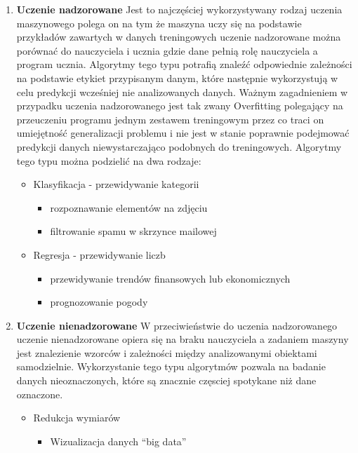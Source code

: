 \begin{enumerate}
    \item \textbf{Uczenie nadzorowane}
    Jest to najczęściej wykorzystywany rodzaj uczenia maszynowego polega on na tym 
    że maszyna uczy się na podstawie przykładów zawartych w danych treningowych 
    uczenie nadzorowane można porównać do nauczyciela i ucznia gdzie dane pełnią rolę nauczyciela 
    a program ucznia. Algorytmy tego typu potrafią znaleźć odpowiednie zależności na podstawie
    etykiet przypisanym danym,
    które następnie wykorzystują w celu predykcji wcześniej nie analizowanych danych.
    Ważnym zagadnieniem w przypadku uczenia nadzorowanego jest tak zwany Overfitting polegający 
    na przeuczeniu programu jednym zestawem treningowym przez co traci on umiejętność generalizacji problemu
    i nie jest w stanie poprawnie podejmować predykcji danych niewystarczająco podobnych
    do treningowych. Algorytmy tego typu można podzielić na dwa rodzaje:
    \begin{itemize}
        \item Klasyfikacja - przewidywanie kategorii
        \begin{itemize}
            \item rozpoznawanie elementów na zdjęciu
            \item filtrowanie spamu w skrzynce mailowej
        \end{itemize}
        \item Regresja - przewidywanie liczb
        \begin{itemize}
            \item przewidywanie trendów finansowych lub ekonomicznych
            \item prognozowanie pogody
        \end{itemize}
    \end{itemize}
    \item \textbf{Uczenie nienadzorowane}
    W przeciwieństwie do uczenia nadzorowanego uczenie nienadzorowane opiera się na braku
    nauczyciela a zadaniem maszyny jest znalezienie wzorców i zależności między analizowanymi
    obiektami samodzielnie. Wykorzystanie tego typu algorytmów pozwala na badanie danych nieoznaczonych,
    które są znacznie częsciej spotykane niż dane oznaczone. 
    \begin{itemize}
        \item Redukcja wymiarów
        \begin{itemize}
            \item Wizualizacja danych ``big data''

\end{itemize}
\end{itemize}
\end{enumerate}
